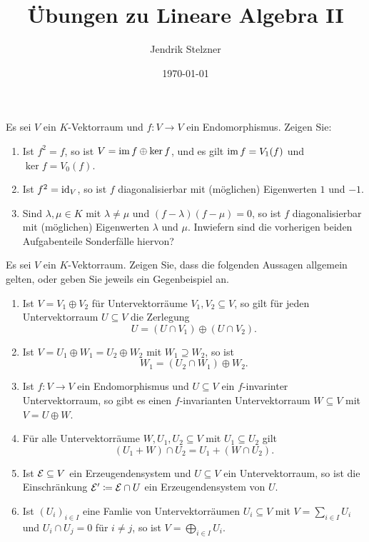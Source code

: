 \documentclass[a4paper,10pt]{article}
\title{Übungen zu Lineare Algebra II}
\author{Jendrik Stelzner}
\date{\today}
\begin{document}
\maketitle



\begin{question}
  Es sei $V$ ein $K$-Vektorraum und $f \colon V \to V$ ein Endomorphismus.
  Zeigen Sie:
  \begin{enumerate}[leftmargin=*]
    \item
      Ist $f^2 = f$, so ist $V = \operatorname{im} f \oplus \ker f$, und es gilt $\operatorname{im} f = V_1(f)$ und $\ker f = V_0(f)$.
    \item
      Ist $f^2 = \operatorname{id}_V$, so ist $f$ diagonalisierbar mit (möglichen) Eigenwerten $1$ und $-1$.
    \item
      Sind $\lambda, \mu \in K$ mit $\lambda \neq \mu$ und $(f-\lambda)(f-\mu) = 0$, so ist $f$ diagonalisierbar mit (möglichen) Eigenwerten $\lambda$ und $\mu$.
      Inwiefern sind die vorherigen beiden Aufgabenteile Sonderfälle hiervon?
  \end{enumerate}
\end{question}


\begin{question}
  Es sei $V$ ein $K$-Vektorraum.
  Zeigen Sie, dass die folgenden Aussagen allgemein gelten, oder geben Sie jeweils ein Gegenbeispiel an.
  \begin{enumerate}[leftmargin=*]
    \item
      Ist $V = V_1 \oplus V_2$ für Untervektorräume $V_1, V_2 \subseteq V$, so gilt für jeden Untervektorraum $U \subseteq V$ die Zerlegung
      \[
        U = (U \cap V_1) \oplus (U \cap V_2).
      \]
    \item
      Ist $V = U_1 \oplus W_1 = U_2 \oplus W_2$ mit $W_1 \supseteq W_2$, so ist
      \[
        W_1 = (U_2 \cap W_1) \oplus W_2.
      \]
    \item
      Ist $f \colon V \to V$ ein Endomorphismus und $U \subseteq V$ ein $f$-invarinter Untervektorraum, so gibt es einen $f$-invarianten Untervektorraum $W \subseteq V$ mit $V = U \oplus W$.
    \item
      Für alle Untervektorräume $W, U_1, U_2 \subseteq V$ mit $U_1 \subseteq U_2$ gilt
      \[
        (U_1 + W) \cap U_2 =  U_1 + (W \cap U_2).
      \]
    \item
      Ist $\mathcal{E} \subseteq V$ ein Erzeugendensystem und $U \subseteq V$ ein Untervektorraum, so ist die Einschränkung $\mathcal{E}' \coloneqq \mathcal{E} \cap U$ ein Erzeugendensystem von $U$.
    \item
      Ist $(U_i)_{i \in I}$ eine Famlie von Untervektorräumen $U_i \subseteq V$ mit $V = \sum_{i \in I} U_i$ und $U_i \cap U_j = 0$ für $i \neq j$, so ist $V = \bigoplus_{i \in I} U_i$.
  \end{enumerate}
\end{question}
\end{document}
